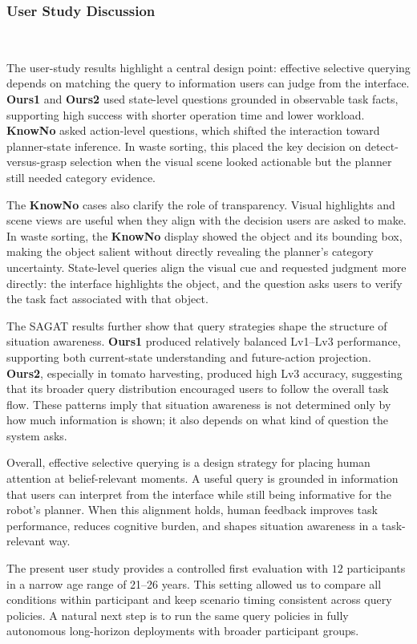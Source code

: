\subsubsection{User Study Discussion}~\label{user:discussion}

The user-study results highlight a central design point: effective selective querying depends on matching the query to information users can judge from the interface. \textbf{Ours1} and \textbf{Ours2} used state-level questions grounded in observable task facts, supporting high success with shorter operation time and lower workload. \textbf{KnowNo} asked action-level questions, which shifted the interaction toward planner-state inference. In waste sorting, this placed the key decision on detect-versus-grasp selection when the visual scene looked actionable but the planner still needed category evidence.

The \textbf{KnowNo} cases also clarify the role of transparency. Visual highlights and scene views are useful when they align with the decision users are asked to make. In waste sorting, the \textbf{KnowNo} display showed the object and its bounding box, making the object salient without directly revealing the planner's category uncertainty. State-level queries align the visual cue and requested judgment more directly: the interface highlights the object, and the question asks users to verify the task fact associated with that object.

The SAGAT results further show that query strategies shape the structure of situation awareness. \textbf{Ours1} produced relatively balanced Lv1--Lv3 performance, supporting both current-state understanding and future-action projection. \textbf{Ours2}, especially in tomato harvesting, produced high Lv3 accuracy, suggesting that its broader query distribution encouraged users to follow the overall task flow. These patterns imply that situation awareness is not determined only by how much information is shown; it also depends on what kind of question the system asks.

Overall, effective selective querying is a design strategy for placing human attention at belief-relevant moments. A useful query is grounded in information that users can interpret from the interface while still being informative for the robot's planner. When this alignment holds, human feedback improves task performance, reduces cognitive burden, and shapes situation awareness in a task-relevant way.

The present user study provides a controlled first evaluation with $12$ participants in a narrow age range of 21--26 years. This setting allowed us to compare all conditions within participant and keep scenario timing consistent across query policies. A natural next step is to run the same query policies in fully autonomous long-horizon deployments with broader participant groups.
